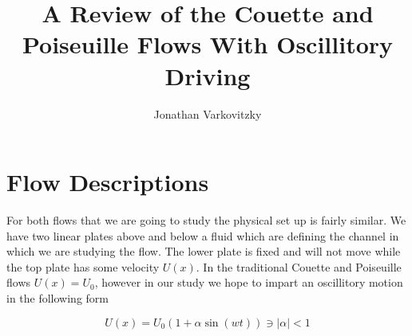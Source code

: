 \documentclass[a4paper,12pt,titlepage]{article}
\begin{document}
\title{A Review of the Couette and Poiseuille Flows With Oscillitory Driving}
\author{Jonathan Varkovitzky}
\maketitle


\pagestyle{plain} %
\tableofcontents

\newpage

\setcounter{page}{2}





\section{Flow Descriptions}

For both flows that we are going to study the physical set up is fairly similar.  We have two linear plates above and below a fluid which are defining the channel in which we are studying the flow.  The lower plate is fixed and will not move while the top plate has some velocity $U(x)$.  In the traditional Couette and Poiseuille flows $U(x) = U_0$, however in our study we hope to impart an oscillitory motion in the following form 

\[
U(x) = U_0(1+\alpha \sin(wt)) \ni |\alpha| < 1
\]
\end{document}
